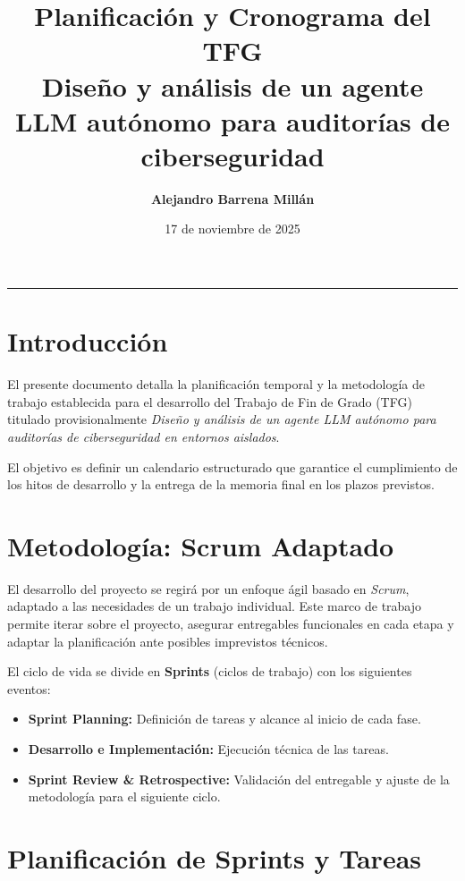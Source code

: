 \documentclass[12pt,a4paper]{article}
\title{
    \vspace{-2cm}
    \Large \textbf{Planificación y Cronograma del TFG}\\[10pt]
    \large Diseño y análisis de un agente LLM autónomo para auditorías de ciberseguridad
}
\author{\textbf{Alejandro Barrena Millán}}
\date{17 de noviembre de 2025}
\begin{document}
\maketitle
\thispagestyle{empty} 
\hrule
\vspace{1em}

\section{Introducción}

El presente documento detalla la planificación temporal y la metodología de trabajo establecida para el desarrollo del Trabajo de Fin de Grado (TFG) titulado provisionalmente \textit{Diseño y análisis de un agente LLM autónomo para auditorías de ciberseguridad en entornos aislados}.

El objetivo es definir un calendario estructurado que garantice el cumplimiento de los hitos de desarrollo y la entrega de la memoria final en los plazos previstos.

\section{Metodología: Scrum Adaptado}

El desarrollo del proyecto se regirá por un enfoque ágil basado en \textit{Scrum}, adaptado a las necesidades de un trabajo individual. Este marco de trabajo permite iterar sobre el proyecto, asegurar entregables funcionales en cada etapa y adaptar la planificación ante posibles imprevistos técnicos.

El ciclo de vida se divide en \textbf{Sprints} (ciclos de trabajo) con los siguientes eventos:
\begin{itemize}
    \item \textbf{Sprint Planning:} Definición de tareas y alcance al inicio de cada fase.
    \item \textbf{Desarrollo e Implementación:} Ejecución técnica de las tareas.
    \item \textbf{Sprint Review \& Retrospective:} Validación del entregable y ajuste de la metodología para el siguiente ciclo.
\end{itemize}

\section{Planificación de Sprints y Tareas}
\end{document}
